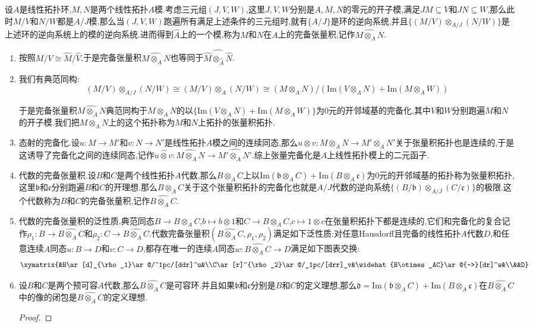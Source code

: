 设$A$是线性拓扑环,$M,N$是两个线性拓扑$A$模.考虑三元组$(J,V,W)$,这里$J,V,W$分别是$A,M,N$的零元的开子模,满足$JM\subseteq V$和$JN\subseteq W$,那么此时$M/V$和$N/W$都是$A/J$模.那么当$(J,V,W)$跑遍所有满足上述条件的三元组时,就有$\{A/J\}$是环的逆向系统,并且$\{(M/V)\otimes_{A/J}(N/W)\}$是上述环的逆向系统上的模的逆向系统.进而得到$\widehat{A}$上的一个模,称为$M$和$N$在$A$上的完备张量积,记作$\widehat{M\otimes_AN}$.
\begin{enumerate}
	\item 按照$M/V\cong\widehat{M}/\widehat{V}$,于是完备张量积$\widehat{M\otimes_AN}$也等同于$\widehat{\widehat{M}\otimes_{\widehat{A}}\widehat{N}}$.
	\item 我们有典范同构:
	$$(M/V)\otimes_{A/J}(N/W)\cong(M/V)\otimes_A(N/W)\cong(M\otimes_AN)/(\mathrm{Im}(V\otimes_AN)+\mathrm{Im}(M\otimes_AW))$$
	
	于是完备张量积$\widehat{M\otimes_AN}$典范同构于$M\otimes_AN$的以$\{\mathrm{Im}(V\otimes_AN)+\mathrm{Im}(M\otimes_AW)\}$为0元的开邻域基的完备化,其中$V$和$W$分别跑遍$M$和$N$的开子模.我们把$M\otimes_AN$上的这个拓扑称为$M$和$N$上拓扑的张量积拓扑.
	\item 态射的完备化.设$u:M\to M'$和$v:N\to N'$是线性拓扑$A$模之间的连续同态,那么$u\otimes v:M\otimes_AN\to M'\otimes_AN'$关于张量积拓扑也是连续的,于是这诱导了完备化之间的连续同态,记作$u\widehat{\otimes}v:\widehat{M\otimes_AN}\to\widehat{M'\otimes_AN'}$.综上张量完备化是$A$上线性拓扑模上的二元函子.
	\item 代数的完备张量积.设$B$和$C$是两个线性拓扑$A$代数,那么$B\otimes_AC$上以$\mathrm{Im}(\mathfrak{b}\otimes_AC)+\mathrm{Im}(B\otimes_A\mathfrak{c})$为0元的开邻域基的拓扑称为张量积拓扑,这里$\mathfrak{b}$和$\mathfrak{c}$分别跑遍$B$和$C$的开理想.那么$B\otimes_AC$关于这个张量积拓扑的完备化也就是$A/J$代数的逆向系统$\{(B/\mathfrak{b})\otimes_{A/J}(C/\mathfrak{c})\}$的极限.这个代数称为$B$和$C$的完备张量积,记作$\widehat{B\otimes_AC}$.
	\item 代数的完备张量积的泛性质.典范同态$B\to B\otimes_AC$,$b\mapsto b\otimes1$和$C\to B\otimes_AC$,$c\mapsto1\otimes c$在张量积拓扑下都是连续的,它们和完备化的复合记作$\rho_1:B\to\widehat{B\otimes_AC}$和$\rho_2:C\to\widehat{B\otimes_AC}$.代数完备张量积$(\widehat{B\otimes_AC},\rho_1,\rho_2)$满足如下泛性质:对任意Hausdorff且完备的线性拓扑$A$代数$D$,和任意连续$A$同态$u:B\to D$和$v:C\to D$,都存在唯一的连续$A$同态$w:\widehat{B\otimes_AC}\to D$满足如下图表交换:
	$$\xymatrix{&B\ar[d]_{\rho_1}\ar@/^1pc/[ddr]^u&\\C\ar[r]^{\rho_2}\ar@/_1pc/[drr]_v&\widehat{B\otimes_AC}\ar@{-->}[dr]^w&\\&&D}$$
	\item 设$B$和$C$是两个预可容$A$代数,那么$\widehat{B\otimes_AC}$是可容环.并且如果$\mathfrak{b}$和$\mathfrak{c}$分别是$B$和$C$的定义理想,那么$\mathfrak{d}=\mathrm{Im}(\mathfrak{b}\otimes_AC)+\mathrm{Im}(B\otimes_A\mathfrak{c})$在$\widehat{B\otimes_AC}$中的像的闭包是$\widehat{B\otimes_AC}$的定义理想.
	\begin{proof}
		

\end{proof}
\end{enumerate}
